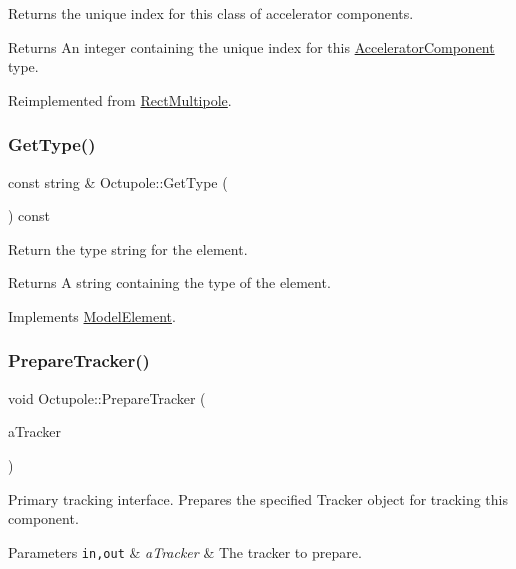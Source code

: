 Returns the unique index for this class of accelerator components. \begin{DoxyReturn}{Returns}
An integer containing the unique index for this \hyperlink{classAcceleratorComponent}{Accelerator\+Component} type. 
\end{DoxyReturn}


Reimplemented from \hyperlink{classRectMultipole_a9bc789b2a193e341aab8bbd47a0e3ad4}{Rect\+Multipole}.

\mbox{\label{classOctupole_a6fc17a6bae176112451bb7aa8d31438c}} 
\subsubsection{\texorpdfstring{Get\+Type()}{GetType()}}
{\footnotesize\ttfamily const string \& Octupole\+::\+Get\+Type (\begin{DoxyParamCaption}{ }\end{DoxyParamCaption}) const\hspace{0.3cm}{\ttfamily [virtual]}}

Return the type string for the element. \begin{DoxyReturn}{Returns}
A string containing the type of the element. 
\end{DoxyReturn}


Implements \hyperlink{classModelElement_a04dc2e51e1999fca612eb1838ec6b271}{Model\+Element}.

\mbox{\label{classOctupole_a646ac61a3ef6a66e987df0364d8bb465}} 
\subsubsection{\texorpdfstring{Prepare\+Tracker()}{PrepareTracker()}}
{\footnotesize\ttfamily void Octupole\+::\+Prepare\+Tracker (\begin{DoxyParamCaption}\item[{\hyperlink{classComponentTracker}{Component\+Tracker} \&}]{a\+Tracker }\end{DoxyParamCaption})\hspace{0.3cm}{\ttfamily [virtual]}}

Primary tracking interface. Prepares the specified Tracker object for tracking this component. 
\begin{DoxyParams}[1]{Parameters}
\mbox{\tt in,out}  & {\em a\+Tracker} & The tracker to prepare. \\
\hline
\end{DoxyParams}


